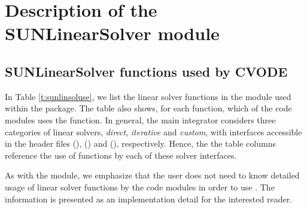 \chapter{Description of the SUNLinearSolver module}\label{s:sunlinsol}



\section{SUNLinearSolver functions used by CVODE}

In Table \ref{t:sunlinsoluse}, we list the linear solver
functions in the {\sunlinsol} module used within the {\cvode} package.
The table also shows, for each function, which of the code modules uses
the function.  In general, the main {\cvode} integrator considers
three categories of linear solvers, \emph{direct}, \emph{iterative}
and \emph{custom}, with interfaces accessible in the {\cvode} header
files  ({\cvdls}), 
({\cvspils}) and  ({\cvcls}), respectively.
Hence, the the table columns reference the use of {\sunlinsol}
functions by each of these solver interfaces.

As with the {\sunmatrix} module, we emphasize that the {\cvode} user
does not need to know detailed usage of linear solver functions by the
{\cvode} code modules in order to use {\cvode}. The information is
presented as an implementation detail for the interested reader.

